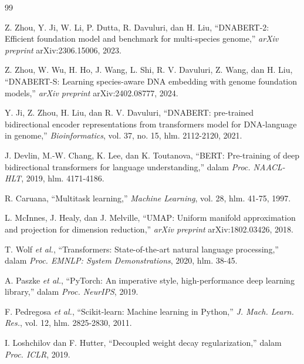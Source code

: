 \documentclass[conference]{IEEEtran}
\begin{document}
\begin{thebibliography}{99}

Z. Zhou, Y. Ji, W. Li, P. Dutta, R. Davuluri, dan H. Liu,
``DNABERT-2: Efficient foundation model and benchmark for multi-species
genome,'' \emph{arXiv preprint} arXiv:2306.15006, 2023.

Z. Zhou, W. Wu, H. Ho, J. Wang, L. Shi, R. V. Davuluri, Z. Wang, dan H. Liu,
``DNABERT-S: Learning species-aware DNA embedding with genome foundation
models,'' \emph{arXiv preprint} arXiv:2402.08777, 2024.

Y. Ji, Z. Zhou, H. Liu, dan R. V. Davuluri,
``DNABERT: pre-trained bidirectional encoder representations from
transformers model for DNA-language in genome,''
\emph{Bioinformatics}, vol. 37, no. 15, hlm. 2112-2120, 2021.

J. Devlin, M.-W. Chang, K. Lee, dan K. Toutanova,
``BERT: Pre-training of deep bidirectional transformers for language
understanding,'' dalam \emph{Proc. NAACL-HLT}, 2019, hlm. 4171-4186.

R. Caruana, ``Multitask learning,'' \emph{Machine Learning}, vol. 28,
hlm. 41-75, 1997.

L. McInnes, J. Healy, dan J. Melville,
``UMAP: Uniform manifold approximation and projection for dimension
reduction,'' \emph{arXiv preprint} arXiv:1802.03426, 2018.

T. Wolf \emph{et al.},
``Transformers: State-of-the-art natural language processing,'' dalam
\emph{Proc. EMNLP: System Demonstrations}, 2020, hlm. 38-45.

A. Paszke \emph{et al.},
``PyTorch: An imperative style, high-performance deep learning library,''
dalam \emph{Proc. NeurIPS}, 2019.

F. Pedregosa \emph{et al.},
``Scikit-learn: Machine learning in Python,''
\emph{J. Mach. Learn. Res.}, vol. 12, hlm. 2825-2830, 2011.

I. Loshchilov dan F. Hutter,
``Decoupled weight decay regularization,'' dalam \emph{Proc. ICLR}, 2019.

\end{thebibliography}
\end{document}
